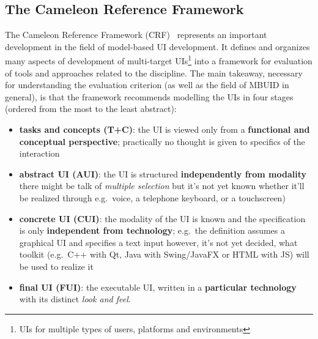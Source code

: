 \subsection{The Cameleon Reference Framework}\label{subsec:the-cameleon-reference-framework}

The Cameleon Reference Framework (CRF)~\cite{calvary_cameleon_framework_2002, calvary_cameleon_glossary_2002} represents an important development in the field of model-based UI development.
It defines and organizes many aspects of development of multi-target UIs\footnote{UIs for multiple types of users, platforms and environments} into a framework for evaluation of tools and approaches related to the discipline.
The main takeaway, necessary for understanding the evaluation criterion (as well as the field of MBUID in general), is that the framework recommends modelling the UIs in four stages (ordered from the most to the least abstract):
\begin{itemize}
    \item \textbf{tasks and concepts (T+C)}: the UI is viewed only from a \textbf{functional and conceptual perspective};
    practically no thought is given to specifics of the interaction
    \item \textbf{abstract UI (AUI)}: the UI is structured \textbf{independently from modality}\,\textemdash\,there might be talk of \emph{multiple selection} but it's not yet known whether it'll be realized through e.g.\ voice, a telephone keyboard, or a touchscreen)
    \item \textbf{concrete UI (CUI)}: the modality of the UI is known and the specification is only \textbf{independent from technology};
    e.g.\ the definition assumes a graphical UI and specifies a text input\,\textemdash\,however, it's not yet decided, what toolkit (e.g.\ C++ with Qt, Java with Swing/JavaFX or HTML with JS) will be used to realize it
    \item \textbf{final UI (FUI)}: the executable UI, written in a \textbf{particular technology} with its distinct \emph{look and feel}.
\end{itemize}

